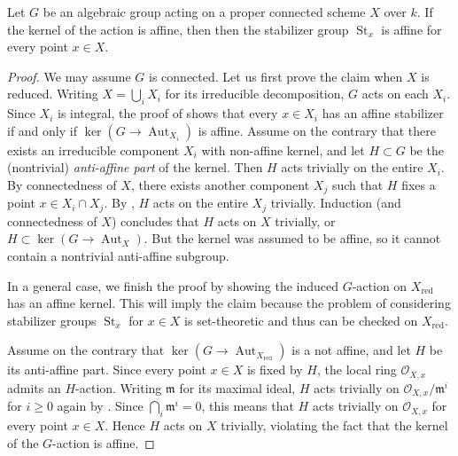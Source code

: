 \documentclass[reqno, letterpaper]{amsart}
\numberwithin{equation}{subsection}
\let\to\longrightarrow
\DeclareMathOperator{\Aut}{Aut}
\DeclareMathOperator{\red}{red}
\DeclareMathOperator{\St}{St}
\begin{document}
		\begin{lemma} \label{lem:linear stabilizer}
			Let $G$ be an algebraic group acting on a proper connected scheme $X$ over $k$. If the kernel of the action is affine, then then the stabilizer group $\St_x$ is affine for every point $x \in X$.
		\end{lemma}
		\begin{proof}
			We may assume $G$ is connected. Let us first prove the claim when $X$ is reduced. Writing $X = \bigcup_i X_i$ for its irreducible decomposition, $G$ acts on each $X_i$. Since $X_i$ is integral, the proof of \cite[Lemma~5.16]{ari-fed16} shows that every $x \in X_i$ has an affine stabilizer if and only if $\ker (G \to \Aut_{X_i})$ is affine. Assume on the contrary that there exists an irreducible component $X_i$ with non-affine kernel, and let $H \subset G$ be the (nontrivial) \emph{anti-affine part} of the kernel. Then $H$ acts trivially on the entire $X_i$. By connectedness of $X$, there exists another component $X_j$ such that $H$ fixes a point $x \in X_i \cap X_j$. By \cite[Lemma~1.1]{brion09}, $H$ acts on the entire $X_j$ trivially. Induction (and connectedness of $X$) concludes that $H$ acts on $X$ trivially, or $H \subset \ker (G \to \Aut_X)$. But the kernel was assumed to be affine, so it cannot contain a nontrivial anti-affine subgroup.
			
			\medskip
			
			In a general case, we finish the proof by showing the induced $G$-action on $X_{\red}$ has an affine kernel. This will imply the claim because the problem of considering stabilizer groups $\St_x$ for $x \in X$ is set-theoretic and thus can be checked on $X_{\red}$.
			
			Assume on the contrary that $\ker (G \to \Aut_{X_{\red}})$ is a not affine, and let $H$ be its anti-affine part. Since every point $x \in X$ is fixed by $H$, the local ring $\mathcal O_{X, x}$ admits an $H$-action. Writing $\mathfrak m$ for its maximal ideal, $H$ acts trivially on $\mathcal O_{X,x} / \mathfrak m^i$ for $i \ge 0$ again by \cite[Lemma~1.1]{brion09}. Since $\bigcap_i \mathfrak m^i = 0$, this means that $H$ acts trivially on $\mathcal O_{X, x}$ for every point $x \in X$. Hence $H$ acts on $X$ trivially, violating the fact that the kernel of the $G$-action is affine.
		\end{proof}
		
\end{document}
